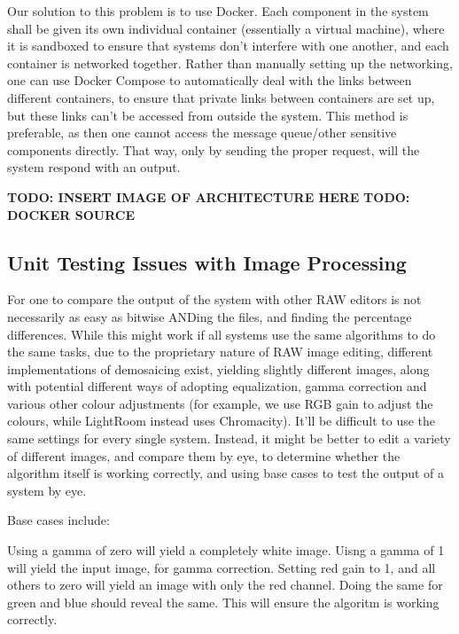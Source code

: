 \documentclass[12pt,a4paper]{article}
\begin{document}
Our solution to this problem is to use Docker. Each component in the system shall be given its own individual container (essentially a virtual machine), where
it is sandboxed to ensure that systems don't interfere with one another, and each container is networked together. Rather than manually setting up the networking,
one can use Docker Compose to automatically deal with the links between different containers, to ensure that private links between containers are set up, but these links
can't be accessed from outside the system. This method is preferable, as then one cannot access the message queue/other sensitive components directly. That way, only by sending
the proper request, will the system respond with an output.

\textbf{TODO: INSERT IMAGE OF ARCHITECTURE HERE}
\textbf{TODO: DOCKER SOURCE }
\subsection{Unit Testing Issues with Image Processing}

For one to compare the output of the system with other RAW editors is not necessarily as easy as bitwise ANDing the files, and finding the percentage
differences. While this might work if all systems use the same algorithms to do the same tasks, due to the proprietary nature of RAW image editing,
different implementations of demosaicing exist, yielding slightly different images, along with potential different ways of adopting equalization,
gamma correction and various other colour adjustments (for example, we use RGB gain to adjust the colours, while LightRoom instead uses Chromacity).
It'll be difficult to use the same settings for every single system. Instead, it might be better to edit a variety of different images, and compare them
by eye, to determine whether the algorithm itself is working correctly, and using base cases to test the output of a system by eye.

Base cases include:

Using a gamma of zero will yield a completely white image. Uisng a gamma of 1 will yield the input image, for gamma correction.
Setting red gain to 1, and all others to zero will yield an image with only the red channel. Doing the same for green and blue should reveal the same.
This will ensure the algoritm is working correctly.
\end{document}
